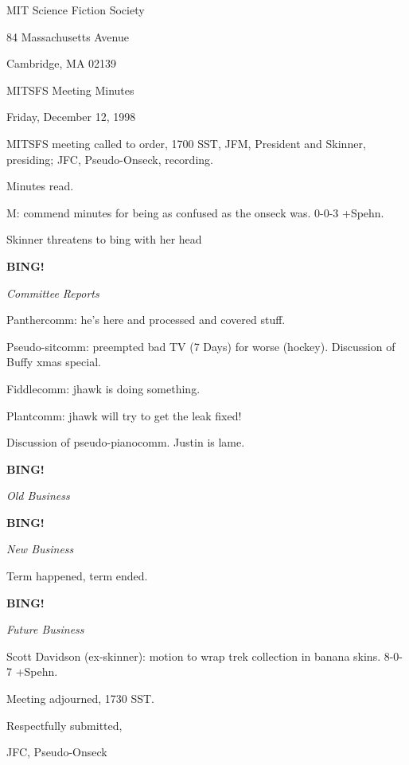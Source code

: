 \documentclass[12pt]{article}
\newcommand{\bing}{{\bf BING!} }
\newcommand{\goto}[1]{\bing \vskip 12pt \centerline{{\em{#1}}}}
\begin{document}
\begin{center}

MIT Science Fiction Society 

84 Massachusetts Avenue

Cambridge, MA 02139

\vspace{12pt}

MITSFS Meeting Minutes 

Friday, December 12, 1998

\end{center}
 
\vspace{18pt}

\setlength{\parskip}{6pt}

\noindent
MITSFS meeting called to order, 1700 SST,
JFM, President and Skinner, presiding; JFC, Pseudo-Onseck, recording.

Minutes read.

M: commend minutes for being as confused as the onseck was. 0-0-3 +Spehn.

Skinner threatens to bing with her head

\goto{Committee Reports}

Panthercomm: he's here and processed and covered stuff.

Pseudo-sitcomm: preempted bad TV (7 Days) for worse (hockey). Discussion of Buffy xmas special.

Fiddlecomm: jhawk is doing something.

Plantcomm: jhawk will try to get the leak fixed!

Discussion of pseudo-pianocomm. Justin is lame.

\goto{Old Business}

\goto{New Business}

Term happened, term ended.

\goto{Future Business}

Scott Davidson (ex-skinner): motion to wrap trek collection in banana skins. 8-0-7 +Spehn.

\vspace{12pt}

\noindent
Meeting adjourned, 1730 SST.

\vspace{18pt}

\centerline{Respectfully submitted,}
\centerline{JFC, Pseudo-Onseck}
\end{document}
